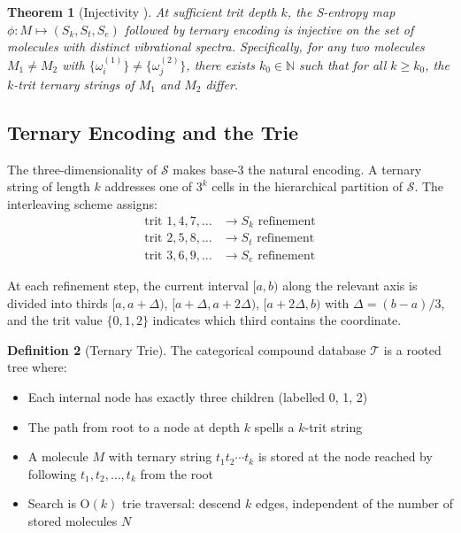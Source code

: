 \documentclass[11pt,a4paper]{article}
\newtheorem{theorem}{Theorem}[section]
\theoremstyle{definition}
\newtheorem{definition}[theorem]{Definition}
\theoremstyle{remark}
\begin{document}
\begin{theorem}[Injectivity \cite{sachikonye2025categorical}]
\label{thm:injectivity}
At sufficient trit depth $k$, the S-entropy map $\phi : M \mapsto (S_k, S_t, S_e)$ followed by ternary encoding is injective on the set of molecules with distinct vibrational spectra. Specifically, for any two molecules $M_1 \neq M_2$ with $\{\omega_i^{(1)}\} \neq \{\omega_j^{(2)}\}$, there exists $k_0 \in \mathbb{N}$ such that for all $k \geq k_0$, the $k$-trit ternary strings of $M_1$ and $M_2$ differ.
\end{theorem}

\subsection{Ternary Encoding and the Trie}

The three-dimensionality of $\mathcal{S}$ makes base-3 the natural encoding. A ternary string of length $k$ addresses one of $3^k$ cells in the hierarchical partition of $\mathcal{S}$. The interleaving scheme assigns:
\begin{align}
\text{trit } 1, 4, 7, \ldots &\to S_k \text{ refinement} \\
\text{trit } 2, 5, 8, \ldots &\to S_t \text{ refinement} \\
\text{trit } 3, 6, 9, \ldots &\to S_e \text{ refinement}
\end{align}

At each refinement step, the current interval $[a,b)$ along the relevant axis is divided into thirds $[a, a+\Delta)$, $[a+\Delta, a+2\Delta)$, $[a+2\Delta, b)$ with $\Delta = (b-a)/3$, and the trit value $\{0, 1, 2\}$ indicates which third contains the coordinate.

\begin{definition}[Ternary Trie]
\label{def:ternary_trie}
The categorical compound database $\mathcal{T}$ is a rooted tree where:
\begin{itemize}
\item Each internal node has exactly three children (labelled 0, 1, 2)
\item The path from root to a node at depth $k$ spells a $k$-trit string
\item A molecule $M$ with ternary string $t_1 t_2 \cdots t_k$ is stored at the node reached by following $t_1, t_2, \ldots, t_k$ from the root
\item Search is O$(k)$ trie traversal: descend $k$ edges, independent of the number of stored molecules $N$
\end{itemize}
\end{definition}
\end{document}

